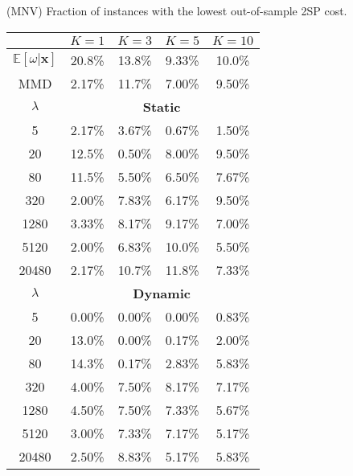 \begin{table}[h]
    \hfill
    \begin{minipage}{0.49\linewidth}
        \TABLE
        {(MNV) Fraction of instances with the lowest out-of-sample 2SP cost. \label{tab:mnv_competition}}
        {
        \begin{tabular}{ccccc}
        \toprule
         & $K=1$ & $K=3$ & $K=5$ & $K=10$ \\
        \midrule
        $\mathbb{E}[\omega | \mathbf{x}]$ & 20.8\%   & 13.8\%   & 9.33\%   & 10.0\%    \\
        MMD & 2.17\%   & 11.7\%   & 7.00\%   & 9.50\%    \\
        \midrule
        \multicolumn{1}{c}{$\lambda$} & \multicolumn{4}{c}{\textbf{Static}} \\
        \midrule
        5      & 2.17\%   & 3.67\%   & 0.67\%   & 1.50\%    \\
        20     & 12.5\%   & 0.50\%   & 8.00\%   & 9.50\%    \\
        80     & 11.5\%   & 5.50\%   & 6.50\%   & 7.67\%    \\
        320    & 2.00\%   & 7.83\%   & 6.17\%   & 9.50\%    \\
        1280   & 3.33\%   & 8.17\%   & 9.17\%   & 7.00\%    \\
        5120   & 2.00\%   & 6.83\%   & 10.0\%   & 5.50\%    \\
        20480  & 2.17\%   & 10.7\%   & 11.8\%   & 7.33\%    \\
        \midrule
        \multicolumn{1}{c}{$\lambda$} & \multicolumn{4}{c}{\textbf{Dynamic}} \\
        \midrule
        5      & 0.00\%   & 0.00\%   & 0.00\%   & 0.83\%    \\
        20     & 13.0\%   & 0.00\%   & 0.17\%   & 2.00\%    \\
        80     & 14.3\%   & 0.17\%   & 2.83\%   & 5.83\%    \\
        320    & 4.00\%   & 7.50\%   & 8.17\%   & 7.17\%    \\
        1280   & 4.50\%   & 7.50\%   & 7.33\%   & 5.67\%    \\
        5120   & 3.00\%   & 7.33\%   & 7.17\%   & 5.17\%    \\
        20480  & 2.50\%   & 8.83\%   & 5.17\%   & 5.83\%    \\
        \bottomrule
        \end{tabular}}{}
    \end{minipage}
\end{table}

